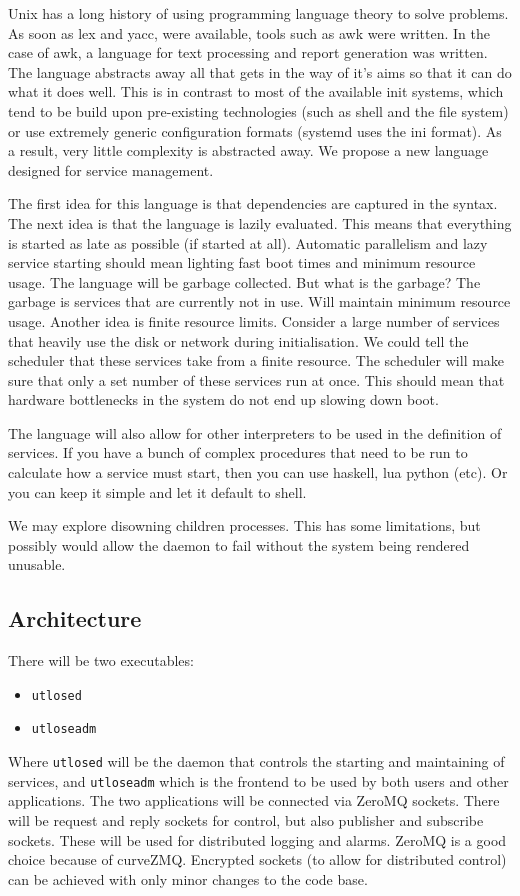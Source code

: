 \documentclass{article}
\begin{document}
Unix has a long history of using programming language theory to solve problems. As soon as
lex and yacc, were available, tools such as awk were written. In the case of awk, a language
for text processing and report generation was written. The language abstracts away all that
gets in the way of it's aims so that it can do what it does well. This is in contrast to most
of the available init systems, which tend to be build upon pre-existing technologies (such
as shell and the file system) or use extremely generic configuration formats (systemd uses
the ini format). As a result, very little complexity is abstracted away. We propose a
new language designed for service management.

The first idea for this language is that dependencies are captured in the syntax. The next idea
is that the language is lazily evaluated. This means that everything is started as late as possible
(if started at all). Automatic parallelism and lazy service starting should mean lighting fast
boot times and minimum resource usage. The language will be garbage collected. But what is
the garbage? The garbage is services that are currently not in use. Will maintain minimum
resource usage. Another idea is finite resource limits. Consider a large number of services
that heavily use the disk or network during initialisation. We could tell the scheduler that
these services take from a finite resource. The scheduler will make sure that only a set number
of these services run at once. This should mean that hardware bottlenecks in the system do not
end up slowing down boot.

The language will also allow for other interpreters to be used in the definition of
services. If you have a bunch of complex procedures that need to be run to calculate how a service
must start, then you can use haskell, lua python (etc). Or you can keep it simple and let it
default to shell.

We may explore disowning children processes. This has some limitations, but possibly would allow
the daemon to fail without the system being rendered unusable.

\subsection{Architecture}
There will be two executables:
\begin{itemize}
  \item \texttt{utlosed}
  \item \texttt{utloseadm}
\end{itemize}
Where \texttt{utlosed} will be the daemon that controls the starting and maintaining of services, and
\texttt{utloseadm} which is the frontend to be used by both users and other applications.
The two applications will be connected via ZeroMQ sockets. There will be request and reply sockets
for control, but also publisher and subscribe sockets. These will be used for distributed logging and alarms.
ZeroMQ is a good choice because of curveZMQ. Encrypted sockets (to allow for distributed control)
can be achieved with only minor changes to the code base.
\end{document}
